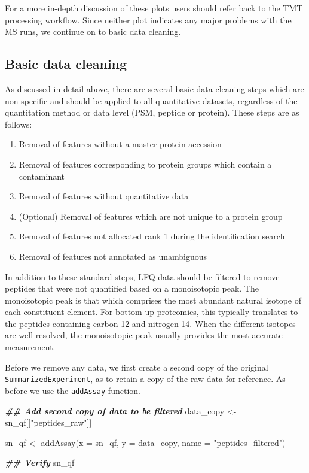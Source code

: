 \documentclass[9pt,a4paper,]{extarticle}
\newenvironment{Shaded}{\begin{snugshade}}{\end{snugshade}}
\newcommand{\AttributeTok}[1]{\textcolor[rgb]{0.77,0.63,0.00}{#1}}
\newcommand{\DocumentationTok}[1]{\textcolor[rgb]{0.56,0.35,0.01}{\textbf{\textit{#1}}}}
\newcommand{\FunctionTok}[1]{\textcolor[rgb]{0.00,0.00,0.00}{#1}}
\newcommand{\NormalTok}[1]{#1}
\newcommand{\OtherTok}[1]{\textcolor[rgb]{0.56,0.35,0.01}{#1}}
\newcommand{\StringTok}[1]{\textcolor[rgb]{0.31,0.60,0.02}{#1}}
\begin{document}
For a more in-depth discussion of these plots users should refer back to the TMT
processing workflow. Since neither plot indicates any major problems with the MS
runs, we continue on to basic data cleaning.

\hypertarget{basic-data-cleaning-1}{%
\subsection{Basic data cleaning}\label{basic-data-cleaning-1}}

As discussed in detail above, there are several basic data cleaning steps which
are non-specific and should be applied to all quantitative datasets, regardless
of the quantitation method or data level (PSM, peptide or protein). These steps
are as follows:

\begin{enumerate}
\def\labelenumi{\arabic{enumi}.}
\item
  Removal of features without a master protein accession
\item
  Removal of features corresponding to protein groups which contain a
  contaminant
\item
  Removal of features without quantitative data
\item
  (Optional) Removal of features which are not unique to a protein group
\item
  Removal of features not allocated rank 1 during the identification search
\item
  Removal of features not annotated as unambiguous
\end{enumerate}

In addition to these standard steps, LFQ data should be filtered to remove
peptides that were not quantified based on a monoisotopic peak. The monoisotopic
peak is that which comprises the most abundant natural isotope of each
constituent element. For bottom-up proteomics, this typically translates to the
peptides containing carbon-12 and nitrogen-14. When the different isotopes are
well resolved, the monoisotopic peak usually provides the most accurate
measurement.

Before we remove any data, we first create a second copy of the original
\texttt{SummarizedExperiment}, as to retain a copy of the raw data for reference. As
before we use the \texttt{addAssay} function.

\begin{Shaded}
\begin{Highlighting}[]
\DocumentationTok{\#\# Add second copy of data to be filtered}
\NormalTok{data\_copy }\OtherTok{\textless{}{-}}\NormalTok{ sn\_qf[[}\StringTok{"peptides\_raw"}\NormalTok{]]}

\NormalTok{sn\_qf }\OtherTok{\textless{}{-}} \FunctionTok{addAssay}\NormalTok{(}\AttributeTok{x =}\NormalTok{ sn\_qf,}
                  \AttributeTok{y =}\NormalTok{ data\_copy, }
                  \AttributeTok{name =} \StringTok{"peptides\_filtered"}\NormalTok{)}

\DocumentationTok{\#\# Verify}
\NormalTok{sn\_qf}
\end{Highlighting}
\end{Shaded}
\end{document}
